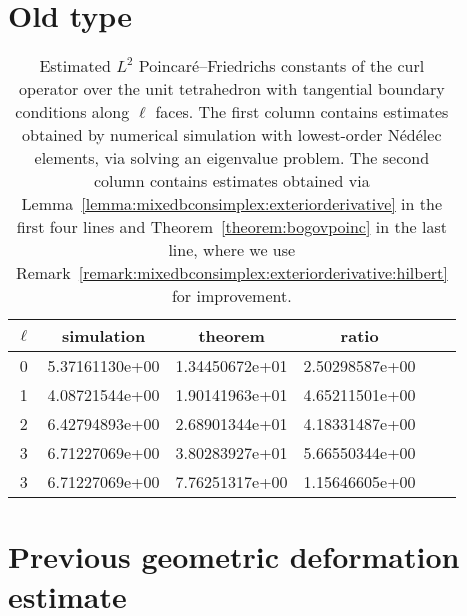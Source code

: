 \documentclass[10pt,a4paper]{article}
\begin{document}
\section{Old type}

\begin{table}[t]
    \centering %
    \begin{tabular}{c|c|c|c|c|c}
        \hline
        $\ell$ & simulation & theorem & ratio \\
        \hline
        0 & 5.37161130e+00 & 1.34450672e+01 & 2.50298587e+00 \\ 
        1 & 4.08721544e+00 & 1.90141963e+01 & 4.65211501e+00 \\
        2 & 6.42794893e+00 & 2.68901344e+01 & 4.18331487e+00 \\
        3 & 6.71227069e+00 & 3.80283927e+01 & 5.66550344e+00 \\
        3 & 6.71227069e+00 & 7.76251317e+00 & 1.15646605e+00 \\
        \hline
    \end{tabular}
    \caption{Estimated $L^2$ Poincar\'e--Friedrichs constants of the curl operator over the unit tetrahedron with tangential boundary conditions along $\ell$ faces. 
    The first column contains estimates obtained by numerical simulation with lowest-order N\'ed\'elec elements, via solving an eigenvalue problem.
    The second column contains estimates obtained via Lemma~\ref{lemma:mixedbconsimplex:exteriorderivative} in the first four lines
    and Theorem~\ref{theorem:bogovpoinc} in the last line, where we use Remark~\ref{remark:mixedbconsimplex:exteriorderivative:hilbert} for improvement. 
    }
\end{table}






\section{Previous geometric deformation estimate}
\end{document}
